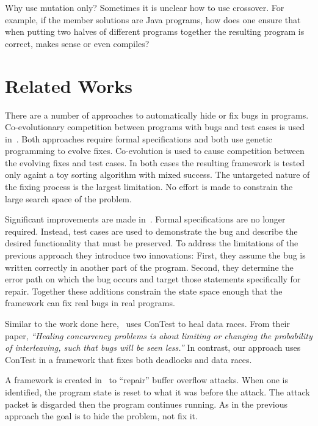 \documentclass[10pt, conference, compsocconf]{IEEEtran}
\begin{document}
Why use mutation only?  Sometimes it is unclear how to use crossover.  For
example, if the member solutions are Java programs, how does one ensure that
when putting two halves of different programs together the resulting program is
correct, makes sense or even compiles?

\section{Related Works}
\label{sec:related_works}

There are a number of approaches to automatically hide or fix bugs in programs.
Co-evolutionary competition between programs with bugs and test cases is used
in~\cite{AY08, Arc08, WT10}. Both approaches require formal specifications and
both use genetic programming to evolve fixes. Co-evolution is used to cause
competition between the evolving fixes and test cases. In both cases the
resulting framework is tested only againt a toy sorting algorithm with mixed
success. The untargeted nature of the fixing process is the largest limitation.
No effort is made to constrain the large search space of the problem.

Significant improvements are made in~\cite{FNWG09,
WNLF09, NWLF09, WFGN10, GNFW11}. Formal specifications are no longer required.
Instead, test cases are used to demonstrate the bug and describe the desired
functionality that must be preserved. To address the limitations of the
previous approach they introduce two innovations: First, they assume the bug is
written correctly in another part of the program. Second, they determine the
error path on which the bug occurs and target those statements specifically for
repair. Together these additions constrain the state space enough that the
framework can fix real bugs in real programs.

Similar to the work done here,~\cite{KLT+07, LVK08} uses ConTest to heal data
races. From their paper, \textit{``Healing concurrency problems is about
limiting or changing the probability of interleaving, such that bugs will be
seen less.''} In contrast, our approach uses ConTest in a framework that
fixes both deadlocks and data races.

A framework is created in~\cite{CB05} to ``repair'' buffer overflow attacks.
When one is identified, the program state is reset to what it was before the
attack. The attack packet is disgarded then the program continues running. As
in the previous approach the goal is to hide the problem, not fix it.
\end{document}

